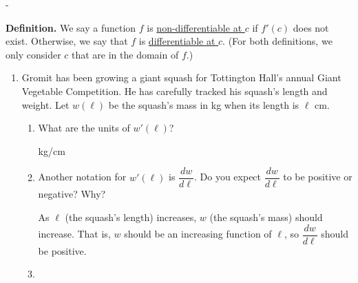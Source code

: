 \documentclass{article}
\makeatletter
\newlength{\tipmargin}
\renewenvironment{framed}{
  \setlength{\tipmargin}{\textwidth-\linewidth}
  \advance\@totalleftmargin-\tipmargin
  \def\FrameCommand{\hspace{\tipmargin}\fbox}%
  \advance\linewidth\tipmargin
  \MakeFramed {\advance\hsize-\width \FrameRestore}%
}
{\endMakeFramed}
\makeatother
\begin{document}
\begin{framed}
  \textbf{Definition.} We say a function $f$ is
  \uline{non-differentiable at $c$} if $f'(c)$ does not exist.
  Otherwise, we say that $f$ is \uline{differentiable at $c$}. (For
  both definitions, we only consider $c$ that are in the domain of
  $f$.) 
\end{framed}

\begin{enumerate}[resume]
\item  \label{interpret-derivatives-gromit-copy}


  \label{interpret-derivatives-gromit}

  Gromit has been growing a giant squash for Tottington Hall's annual Giant Vegetable Competition. He has carefully tracked his squash's length and weight. Let $w(\ell)$ be the squash's mass in kg when its length is $\ell$ cm.
  \begin{enumerate}
  \item
    \begin{problem}[0.25in]
      What are the units of $w'(\ell)$?  
    \end{problem}

    \begin{solution}
      kg/cm
    \end{solution}

  \item
    \begin{problem}[0.35in]
      Another notation for $w'(\ell)$ is $\dfrac{dw}{d\ell}$. Do you expect $\dfrac{dw}{d\ell}$ to be positive or negative? Why?
    \end{problem}

    \begin{solution}
      As $\ell$ (the squash's length) increases, $w$ (the squash's mass) should increase. That is, $w$ should be an increasing function of $\ell$, so $\dfrac{dw}{d\ell}$ should be positive.
    \end{solution}

\item



\end{enumerate}
\end{enumerate}
\end{document}
